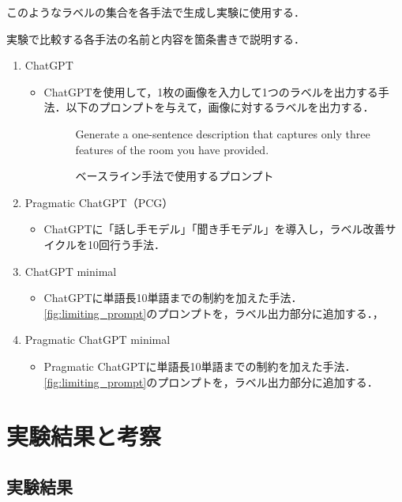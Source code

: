 \documentclass[a4paper,11pt]{jreport}
\begin{document}
このようなラベルの集合を各手法で生成し実験に使用する．

実験で比較する各手法の名前と内容を箇条書きで説明する．

\begin{enumerate}
  \item ChatGPT
  \begin{itemize}
  \item ChatGPTを使用して，1枚の画像を入力して1つのラベルを出力する手法．以下のプロンプトを与えて，画像に対するラベルを出力する．
  \begin{figure}[H]
    \begin{mdframed}[linewidth=1pt]
      Generate a one-sentence description that captures only three features of the room you have provided.
    \end{mdframed}
    \caption{ベースライン手法で使用するプロンプト}
    \label{fig:baseline_prompt}
  \end{figure}
\end{itemize}
  
  \item Pragmatic ChatGPT（PCG）
  \begin{itemize}
    \item ChatGPTに「話し手モデル」「聞き手モデル」を導入し，ラベル改善サイクルを10回行う手法．
  \end{itemize}
    
  \item ChatGPT minimal
  \begin{itemize}
    \item ChatGPTに単語長10単語までの制約を加えた手法．\ref{fig:limiting_prompt}のプロンプトを，ラベル出力部分に追加する．，
  \end{itemize}
  
  \item Pragmatic ChatGPT minimal
  \begin{itemize}
    \item Pragmatic ChatGPTに単語長10単語までの制約を加えた手法．\ref{fig:limiting_prompt}のプロンプトを，ラベル出力部分に追加する．
  \end{itemize}
  
\end{enumerate}

\section{実験結果と考察}

\subsection{実験結果}
\end{document}
